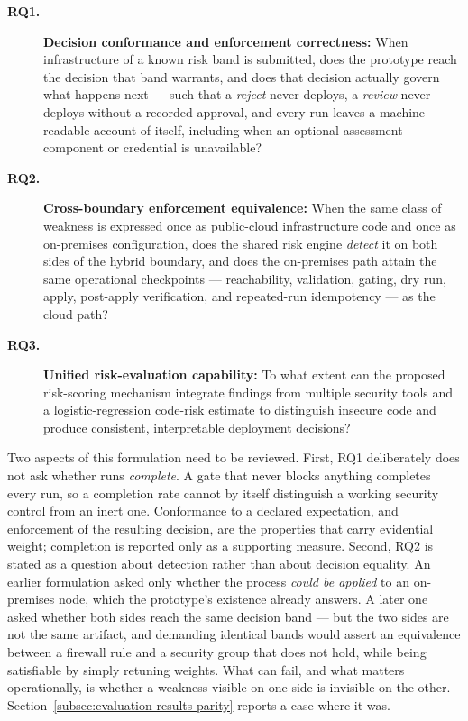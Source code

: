 \begin{description}
    \item[\textbf{RQ1.}] \textbf{Decision conformance and enforcement correctness:}
    When infrastructure of a known risk band is submitted, does the prototype
    reach the decision that band warrants, and does that decision actually
    govern what happens next --- such that a \emph{reject} never deploys, a
    \emph{review} never deploys without a recorded approval, and every run
    leaves a machine-readable account of itself, including when an optional
    assessment component or credential is unavailable?

    \item[\textbf{RQ2.}] \textbf{Cross-boundary enforcement equivalence:} When the
    same class of weakness is expressed once as public-cloud infrastructure code
    and once as on-premises configuration, does the shared risk engine
    \emph{detect} it on both sides of the hybrid boundary, and does the
    on-premises path attain the same operational checkpoints --- reachability,
    validation, gating, dry run, apply, post-apply verification, and repeated-run
    idempotency --- as the cloud path?

    \item[\textbf{RQ3.}] \textbf{Unified risk-evaluation capability:} To what extent
    can the proposed risk-scoring mechanism integrate findings from multiple security
    tools and a logistic-regression code-risk estimate to distinguish insecure code and
    produce consistent, interpretable deployment decisions?
\end{description}

Two aspects of this formulation need to be reviewed. First, RQ1 deliberately does
not ask whether runs \emph{complete}. A gate that never blocks anything
completes every run, so a completion rate cannot by itself distinguish a working
security control from an inert one. Conformance to a declared expectation, and
enforcement of the resulting decision, are the properties that carry evidential
weight; completion is reported only as a supporting measure. Second, RQ2 is
stated as a question about detection rather than about decision equality. An
earlier formulation asked only whether the process \emph{could be applied} to an
on-premises node, which the prototype's existence already answers. A later one
asked whether both sides reach the same decision band --- but the two sides are
not the same artifact, and demanding identical bands would assert an equivalence
between a firewall rule and a security group that does not hold, while being
satisfiable by simply retuning weights. What can fail, and what matters
operationally, is whether a weakness visible on one side is invisible on the
other. Section~\ref{subsec:evaluation-results-parity} reports a case where it
was.



